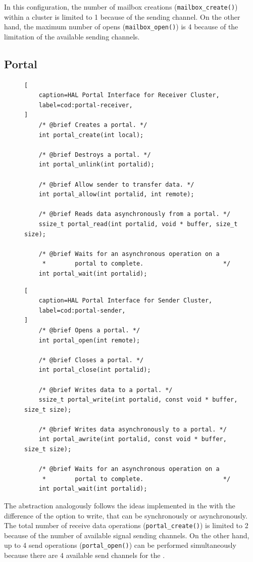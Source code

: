 		In this configuration, the number of mailbox creations (\texttt{mailbox\_create()})
		within a cluster is limited to 1 because of the \cnoc sending channel.
		On the other hand, the maximum number of opens (\texttt{mailbox\_open()}) is
		4 because of the limitation of the available \dnoc sending channels.

	\subsection{Portal}

\begin{figure}[t]
\begin{lstlisting}[
	caption=HAL Portal Interface for Receiver Cluster,
	label=cod:portal-receiver,
]
	/* @brief Creates a portal. */
	int portal_create(int local);

	/* @brief Destroys a portal. */
	int portal_unlink(int portalid);

	/* @brief Allow sender to transfer data. */
	int portal_allow(int portalid, int remote);

	/* @brief Reads data asynchronously from a portal. */
	ssize_t portal_read(int portalid, void * buffer, size_t size);

	/* @brief Waits for an asynchronous operation on a
	 *        portal to complete.                      */
	int portal_wait(int portalid);
\end{lstlisting}
\end{figure}

\begin{figure}[t]
\begin{lstlisting}[
	caption=HAL Portal Interface for Sender Cluster,
	label=cod:portal-sender,
]
	/* @brief Opens a portal. */
	int portal_open(int remote);

	/* @brief Closes a portal. */
	int portal_close(int portalid);

	/* @brief Writes data to a portal. */
	ssize_t portal_write(int portalid, const void * buffer, size_t size);

	/* @brief Writes data asynchronously to a portal. */
	int portal_awrite(int portalid, const void * buffer, size_t size);

	/* @brief Waits for an asynchronous operation on a
	 *        portal to complete.                      */
	int portal_wait(int portalid);
\end{lstlisting}
\end{figure}

		The \portal abstraction analogously follows the ideas implemented
		in the \mailbox with the difference of the option to write,
		that can be synchronously or asynchronously.
		The total number of receive data operations (\texttt{portal\_create()})
		is limited to 2 because of the number of available signal sending channels.
		On the other hand, up to 4 send operations (\texttt{portal\_open()})
		can be performed simultaneously because there are 4 available send
		channels for the \portal.


